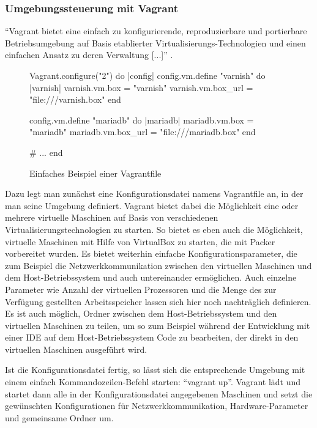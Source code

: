 \subsubsection{Umgebungssteuerung mit Vagrant}

"`Vagrant bietet eine einfach zu konfigurierende, reproduzierbare und portierbare Betriebsumgebung auf Basis etablierter Virtualisierungs-Technologien und einen einfachen Ansatz zu deren Verwaltung [...]"' \citep[Siehe][]{Vagrant:001}.

\begin{figure}[!ht]
  \begin{center}
    \begin{rubycode}
Vagrant.configure("2") do |config|
  config.vm.define "varnish" do |varnish|
    varnish.vm.box = "varnish"
    varnish.vm.box_url = "file:///varnish.box"
  end

  config.vm.define "mariadb" do |mariadb|
    mariadb.vm.box = "mariadb"
    mariadb.vm.box_url = "file:///mariadb.box"
  end

  # ...
end
    \end{rubycode}
    \caption{Einfaches Beispiel einer Vagrantfile}
  \end{center}
\end{figure}

Dazu legt man zunächst eine Konfigurationsdatei namens Vagrantfile an, in der man seine Umgebung definiert. Vagrant bietet dabei die Möglichkeit eine oder mehrere virtuelle Maschinen auf Basis von verschiedenen Virtualisierungstechnologien zu starten. So bietet es eben auch die Möglichkeit, virtuelle Maschinen mit Hilfe von VirtualBox zu starten, die mit Packer vorbereitet wurden. Es bietet weiterhin einfache Konfigurationsparameter, die zum Beispiel die Netzwerkkommunikation zwischen den virtuellen Maschinen und dem Host-Betriebssystem und auch untereinander ermöglichen. Auch einzelne Parameter wie Anzahl der virtuellen Prozessoren und die Menge des zur Verfügung gestellten Arbeitsspeicher lassen sich hier noch nachträglich definieren. Es ist auch möglich, Ordner zwischen dem Host-Betriebssystem und den virtuellen Maschinen zu teilen, um so zum Beispiel während der Entwicklung mit einer IDE auf dem Host-Betriebssystem Code zu bearbeiten, der direkt in den virtuellen Maschinen ausgeführt wird.

Ist die Konfigurationsdatei fertig, so lässt sich die entsprechende Umgebung mit einem einfach Kommandozeilen-Befehl starten: "`vagrant up"'. Vagrant lädt und startet dann alle in der Konfigurationsdatei angegebenen Maschinen und setzt die gewünschten Konfigurationen für Netzwerkkommunikation, Hardware-Parameter und gemeinsame Ordner um.

